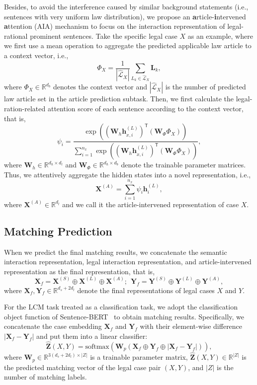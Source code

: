 Besides, to avoid the interference caused by similar background statements (i.e., sentences with very uniform law distribution), we propose an \textbf{a}rticle-\textbf{i}ntervened \textbf{a}ttention (AIA) mechanism to focus on the interaction representation of legal-rational prominent sentences. 
Take the specific legal case $X$ as an example, where we first use a mean operation to aggregate the predicted applicable law article to a context vector, i.e.,
\[
\Phi_{X} = \frac{1}{|\hat{\mathcal{L}}_{X}|} \sum_{L_k\in \hat{\mathcal{L}}_X} \mathbf{L}_k,
\]
where $\Phi_{X} \in \mathbb{R}^{d_b}$ denotes the context vector and $|\hat{\mathcal{L}}_{X}|$ is the number of predicted law article set in the article prediction subtask.
Then, we first calculate the legal-ration-related attention score of each sentence according to the context vector, that is,
\[
\psi_i = \frac{\exp\left((\mathbf{W}_h\mathbf{h}_{x,i}^{(L)})^\mathsf{T}(\mathbf{W}_{\Phi}\Phi_{X})\right)}{\sum_{i=1}^{n_x}\exp\left((\mathbf{W}_h\mathbf{h}_{x,i}^{(L)})^\mathsf{T}(\mathbf{W}_{\Phi}\Phi_{X})\right)},
\]
where $\mathbf{W}_h \in \mathbb{R}^{d_h \times d_l} $ and $\mathbf{W}_{\Phi} \in \mathbb{R}^{d_h \times d_b}$ denote the trainable parameter matrices.
Thus, we attentively aggregate the hidden states into a novel representation, i.e.,
\[
\mathbf{X}^{(A)} = \sum_{i=1}^{n_x}\psi_i\mathbf{h}_{i}^{(L)},
\]
where $\mathbf{X}^{(A)} \in \mathbb{R}^{d_l}$ and we call it the article-intervened representation of case $X$.

\subsection{Matching Prediction}
When we predict the final matching results, we concatenate the semantic interaction representation, legal interaction representation, and article-intervened representation as the final representation, that is,
\[
\mathbf{X}_f = \mathbf{X}^{(S)} \oplus \mathbf{X}^{(L)} \oplus \mathbf{X}^{(A)};
\ \ 
\mathbf{Y}_f = \mathbf{Y}^{(S)} \oplus \mathbf{Y}^{(L)} \oplus \mathbf{Y}^{(A)},
\]
where $\mathbf{X}_f, \mathbf{Y}_f \in \mathbb{R}^{d_s + 2d_l}$ denote the final representations of legal cases $X$ and $Y$.

For the LCM task treated as a classification task, we adopt the classification object function of Sentence-BERT~\cite{reimers2019sentence-BERT} to obtain matching results.
Specifically, we concatenate the case embedding $\mathbf{X}_f$ and $\mathbf{Y}_f$ with their element-wise difference $|\mathbf{X}_f - \mathbf{Y}_f|$ and put them into a linear classifier:
\[ 
\hat{\mathbf{Z}}(X, Y) = \text{softmax}\left(\mathbf{W}_p\left(\mathbf{X}_f \oplus \mathbf{Y}_f \oplus |\mathbf{X}_f - \mathbf{Y}_f|\right)\right),
\]
where $\mathbf{W}_p \in \mathbb{R}^{3(d_s + 2d_l) \times |Z|}$ is a trainable parameter matrix, $\hat{\textbf{Z}}(X, Y) \in \mathbb{R}^{|Z|}$ is the predicted matching vector of the legal case pair $(X, Y)$, and $|Z|$ is the number of matching labels.

